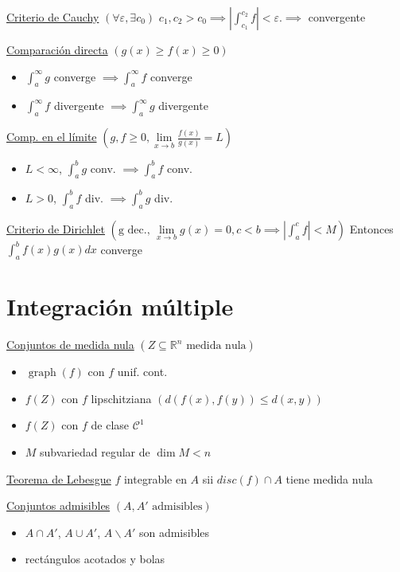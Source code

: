 \documentclass[12pt]{article}
\newcommand{\real}{\mathbb{R}}
\newcommand{\C}{\mathscr{C}}
\newcommand{\abs}[1]{\left\vert #1 \right\vert}
\DeclareMathOperator{\graph}{graph}
\begin{document}
\begin{multicols}{3}
    \underline{Criterio de Cauchy} $\left( \forall \varepsilon, \exists c_0 \right)$
    $c_1, c_2 > c_0 \implies \abs{\int_{c_1}^{c_2} f} < \varepsilon. \implies$ convergente
    
    
    \underline{Comparación directa} $\left( g(x) \geq f(x) \geq 0 \right)$
    \begin{itemize}
        \item $\int_{a}^{\infty} g$ converge $\implies \int_{a}^{\infty} f$ converge
        \item $\int_{a}^{\infty} f$ divergente $\implies \int_{a}^{\infty} g$ divergente
    \end{itemize}
    
    \underline{Comp. en el límite} $\left( g, f \geq 0,
    \lim\limits_{x \to b} \frac{f(x)}{g(x)} = L \right)$
    \begin{itemize}
        \item $L < \infty$, $\int_{a}^{b} g$ conv. $\implies \int_{a}^{b} f$ conv.
        \item $L > 0$, $\int_{a}^{b} f$ div. $\implies \int_{a}^{b} g$ div.
    \end{itemize}
    
    \underline{Criterio de Dirichlet} $\left(\text{g dec., }\lim\limits_{x \to b} g(x) = 0,
    c < b \implies \abs{\int_{a}^{c} f} < M\right)$
    Entonces $\int_{a}^{b} f(x)g(x)dx$ converge
    
    \section{Integración múltiple}
    
    \underline{Conjuntos de medida nula} $\left( Z \subseteq \real^n \text{ medida nula} \right)$
    \begin{itemize}
        \item $\graph(f)$ con $f$ unif. cont.
        \item $f(Z)$ con $f$ lipschitziana $\left( d(f(x),f(y)) \leq d(x,y) \right)$
        \item $f(Z)$ con $f$ de clase $\C^1$
        \item $M$ subvariedad regular de $\dim M < n$
    \end{itemize}
    
    \underline{Teorema de Lebesgue}
    $f$ integrable en $A$ sii $disc(f) \cap A$ tiene medida nula
    
    \underline{Conjuntos admisibles} $\left( A, A' \text{ admisibles} \right)$
    \begin{itemize}
        \item $A \cap A'$, $A \cup A'$, $A \smallsetminus A'$ son admisibles
        \item rectángulos acotados y bolas
    \end{itemize}
    

\end{multicols}
\end{document}
